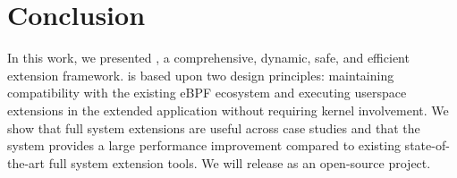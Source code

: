 \section{Conclusion}\label{sec:conclusion}

In this work, we presented \sys, a comprehensive, dynamic, safe, and efficient extension framework. \sys is based upon two design principles: maintaining compatibility with the existing eBPF ecosystem and executing userspace extensions in the extended application without requiring kernel involvement.  We show that \sys full system extensions are useful across \numcases case studies and that the system provides a large performance improvement compared to existing state-of-the-art full system extension tools.  We  will release \sys as an open-source project. 

